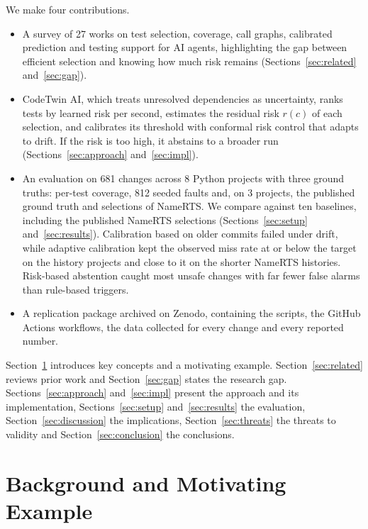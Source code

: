 \documentclass[conference]{IEEEtran}
\begin{document}
We make four contributions.
\begin{itemize}
    \item A survey of 27 works on test selection, coverage, call graphs, calibrated prediction and testing support for AI agents, highlighting the gap between efficient selection and knowing how much risk remains (Sections~\ref{sec:related} and~\ref{sec:gap}).
    \item CodeTwin AI, which treats unresolved dependencies as uncertainty, ranks tests by learned risk per second, estimates the residual risk $r(c)$ of each selection, and calibrates its threshold with conformal risk control that adapts to drift. If the risk is too high, it abstains to a broader run (Sections~\ref{sec:approach} and~\ref{sec:impl}).
    \item An evaluation on 681 changes across 8 Python projects with three ground truths: per-test coverage, 812 seeded faults and, on 3 projects, the published ground truth and selections of NameRTS. We compare against ten baselines, including the published NameRTS selections (Sections~\ref{sec:setup} and~\ref{sec:results}). Calibration based on older commits failed under drift, while adaptive calibration kept the observed miss rate at or below the target on the history projects and close to it on the shorter NameRTS histories. Risk-based abstention caught most unsafe changes with far fewer false alarms than rule-based triggers.
    \item A replication package archived on Zenodo, containing the scripts, the GitHub Actions workflows, the data collected for every change and every reported number.
\end{itemize}

Section~\ref{sec:background} introduces key concepts and a motivating example. Section~\ref{sec:related} reviews prior work and Section~\ref{sec:gap} states the research gap. Sections~\ref{sec:approach} and~\ref{sec:impl} present the approach and its implementation, Sections~\ref{sec:setup} and~\ref{sec:results} the evaluation, Section~\ref{sec:discussion} the implications, Section~\ref{sec:threats} the threats to validity and Section~\ref{sec:conclusion} the conclusions.

\section{Background and Motivating Example}\label{sec:background}
\end{document}
